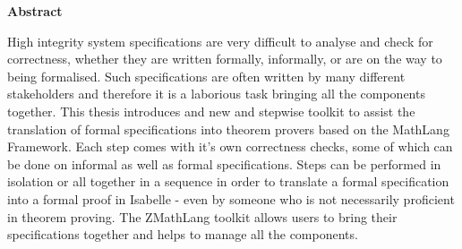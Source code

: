 \begin{center}
\LARGE\textbf {Abstract}
\end{center}
\vspace{1cm}

\begin{spacing}{1} 
\noindent
High integrity system specifications are very difficult to analyse and check for
correctness, whether they are written formally, informally, or are on the way to
being formalised. Such specifications are often written by many different 
stakeholders and therefore it is a laborious task bringing all the components
together. This thesis introduces and new and stepwise toolkit to assist the
translation of formal specifications into theorem provers based on the MathLang 
Framework. Each step comes with
it's own correctness checks, some of which can be done on informal as well as
formal specifications. Steps can be performed in isolation or all together in a 
sequence in order to translate a formal specification into a formal proof in
Isabelle - even by someone who is not necessarily proficient in theorem proving. The
ZMathLang toolkit allows users to bring their specifications together and helps
to manage all the components.

\end{spacing}